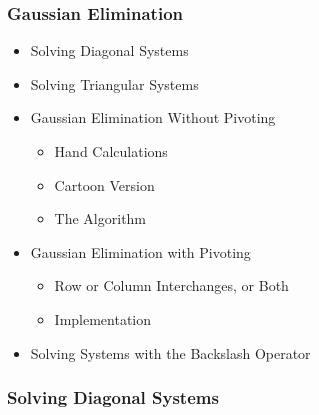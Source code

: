 \documentclass[10pt]{beamer}
\begin{document}
\begin{frame}
\frametitle{Gaussian Elimination}

\begin{itemize}
\item   Solving Diagonal Systems
\item   Solving Triangular Systems
\item   Gaussian Elimination Without Pivoting
	\begin{itemize}
		\item   Hand Calculations
		\item   Cartoon Version
		\item   The Algorithm
	\end{itemize}
\item   Gaussian Elimination with Pivoting
	\begin{itemize}
		\item   Row or Column Interchanges, or Both
		\item   Implementation
	\end{itemize}
\item   Solving Systems with the Backslash Operator
\end{itemize}

\end{frame}
\begin{frame}
\frametitle{Solving Diagonal Systems}



\end{frame}
\end{document}
